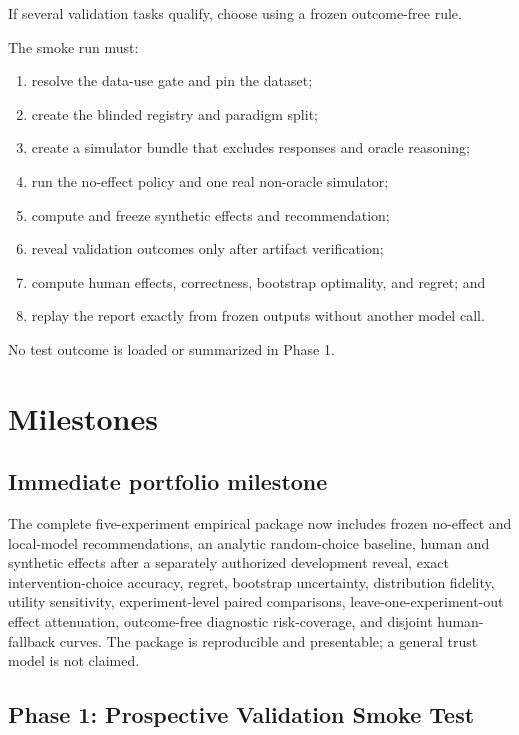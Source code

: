 \documentclass[11pt]{article}
\begin{document}
If several validation tasks qualify, choose using a frozen outcome-free rule.

The smoke run must:

\begin{enumerate}
\item resolve the data-use gate and pin the dataset;
\item create the blinded registry and paradigm split;
\item create a simulator bundle that excludes responses and oracle reasoning;
\item run the no-effect policy and one real non-oracle simulator;
\item compute and freeze synthetic effects and recommendation;
\item reveal validation outcomes only after artifact verification;
\item compute human effects, correctness, bootstrap optimality, and regret; and
\item replay the report exactly from frozen outputs without another model call.
\end{enumerate}

No test outcome is loaded or summarized in Phase 1.

\section{Milestones}

\subsection*{Immediate portfolio milestone}

The complete five-experiment empirical package now includes frozen no-effect and local-model recommendations, an analytic random-choice baseline, human and synthetic effects after a separately authorized development reveal, exact intervention-choice accuracy, regret, bootstrap uncertainty, distribution fidelity, utility sensitivity, experiment-level paired comparisons, leave-one-experiment-out effect attenuation, outcome-free diagnostic risk-coverage, and disjoint human-fallback curves. The package is reproducible and presentable; a general trust model is not claimed.

\subsection*{Phase 1: Prospective Validation Smoke Test}
\end{document}
